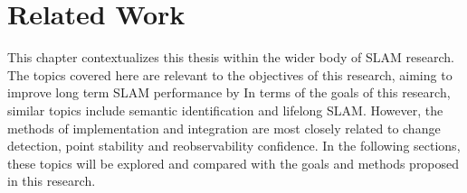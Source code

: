 \section{Related Work}
\label{sec:related_work}

This chapter contextualizes this thesis within the wider body of SLAM research. The topics covered here are relevant to the objectives of this research, aiming to improve long term SLAM performance by 
In terms of the goals of this research, similar topics include semantic identification and lifelong SLAM. However, the methods of implementation and integration are most closely related to change detection, point stability and reobservability confidence. In the following sections, these topics will be explored and compared with the goals and methods proposed in this research.

% 
